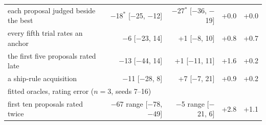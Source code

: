 \begin{tabular}{lrrrr}
each proposal judged beside the best & $-$18$^{*}$ {\scriptsize [$-$25, $-$12]} & $-$27$^{*}$ {\scriptsize [$-$36, $-$19]} & +0.0 & +0.0 \\
every fifth trial rates an anchor & $-$6 {\scriptsize [$-$23, 14]} & +1 {\scriptsize [$-$8, 10]} & +0.8 & +0.7 \\
the first five proposals rated late & $-$13 {\scriptsize [$-$44, 14]} & +1 {\scriptsize [$-$11, 11]} & +1.6 & +0.2 \\
a ship-rule acquisition & $-$11 {\scriptsize [$-$28, 8]} & +7 {\scriptsize [$-$7, 21]} & +0.9 & +0.2 \\
\multicolumn{5}{l}{fitted oracles, rating error ($n = 3$, seeds 7--16)} \\
first ten proposals rated twice & $-$67 {\scriptsize range [$-$78, $-$49]} & $-$5 {\scriptsize range [$-$21, 6]} & +2.8 & +1.1 \\
\bottomrule
\end{tabular}
